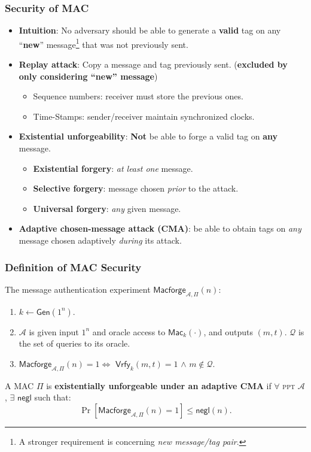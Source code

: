 \begin{frame}\frametitle{Security of MAC}
\begin{itemize}
\item \textbf{Intuition}: No adversary should be able to generate a \textbf{valid} tag on any ``\textbf{new}'' message\footnote{A stronger requirement is concerning \emph{new message/tag pair}.} that was not previously sent.
\item \textbf{Replay attack}: Copy a message and tag previously sent. (\textbf{excluded by only considering ``new'' message})
\begin{itemize}
\item Sequence numbers: receiver must store the previous ones.
\item Time-Stamps: sender/receiver maintain synchronized clocks.
\end{itemize}
\item \textbf{Existential unforgeability}: \textbf{Not} be able to forge a valid tag on \textbf{any} message.
\begin{itemize}
\item \textbf{Existential forgery}: \emph{at least one} message.
\item \textbf{Selective forgery}: message chosen \emph{prior} to the attack.
\item \textbf{Universal forgery}: \emph{any} given message.
\end{itemize}
\item \textbf{Adaptive chosen-message attack (CMA)}: be able to obtain tags on \emph{any} message chosen adaptively \emph{during} its attack.
\end{itemize}
\end{frame}
\begin{frame}\frametitle{Definition of MAC Security}
The message authentication experiment $\mathsf{Macforge}_{\mathcal{A},\Pi }(n)$:
\begin{enumerate}
\item $k \gets \mathsf{Gen}(1^n)$.
\item $\mathcal{A}$ is given input $1^n$ and oracle access to $\mathsf{Mac}_k(\cdot)$, and outputs $(m,t)$. $\mathcal{Q}$ is the set of queries to its oracle.
\item $\mathsf{Macforge}_{\mathcal{A},\Pi }(n)=1 \iff$ $\mathsf{Vrfy}_k(m,t)=1$ $\land$ $m \notin \mathcal{Q}$. 
\end{enumerate}
\begin{figure}
\begin{center}

\end{center}
\end{figure}
\begin{definition}
A MAC $\Pi$ is \textbf{existentially unforgeable under an adaptive CMA} if $\forall$ \textsc{ppt} $\mathcal{A}$, $\exists$ $\mathsf{negl}$ such that:
\[ \Pr [\mathsf{Macforge}_{\mathcal{A},\Pi }(n)=1] \le \mathsf{negl}(n).
\]
\end{definition}
\end{frame}
